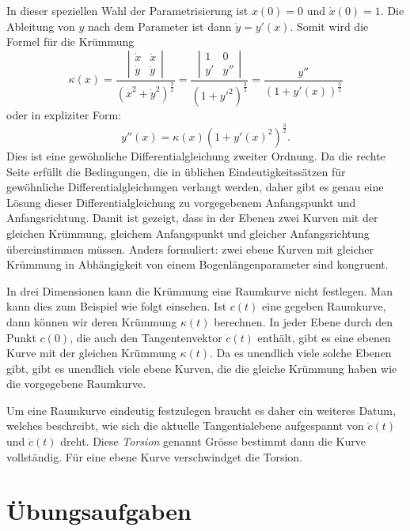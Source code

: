 
In dieser speziellen Wahl der Parametrisierung ist $x(0)=0$ und $\dot x(0)=1$.
Die Ableitung von $y$ nach dem Parameter ist dann $\dot y=y'(x)$.
Somit wird die Formel für die Krümmung
\[
\kappa(x)
=
\frac{\left|\begin{matrix}\dot x&\ddot x\\\dot y&\ddot y\end{matrix}\right|}{(\dot x^2+\dot y^2)^{\frac32}}
=
\frac{\left|\begin{matrix}1&0\\y'&y''\end{matrix}\right|}{(1+y'^2)^{\frac32}}
=
\frac{y''}{(1+y'(x))^{\frac32}}
\]
oder in expliziter Form:
\[
y''(x)=\kappa(x) (1+y'(x)^2)^{\frac32}.
\]
Dies ist eine gewöhnliche Differentialgleichung zweiter Ordnung.
Da die rechte Seite erfüllt die Bedingungen, die in üblichen
Eindeutigkeitssätzen für gewöhnliche Differentialgleichungen
verlangt werden, daher gibt es genau eine Lösung dieser
Differentialgleichung zu vorgegebenem Anfangspunkt und Anfangsrichtung.
Damit ist gezeigt, dass in der Ebenen zwei Kurven mit der gleichen
Krümmung, gleichem Anfangspunkt und gleicher Anfangsrichtung übereinstimmen
müssen.
Anders formuliert: zwei ebene Kurven mit gleicher Krümmung in Abhängigkeit
von einem Bogenlängenparameter sind kongruent.

In drei Dimensionen kann die Krümmung eine Raumkurve nicht festlegen.
Man kann dies zum Beispiel wie folgt einsehen.
Ist $c(t)$ eine gegeben Raumkurve, dann können wir deren Krümmung
$\kappa(t)$ berechnen.
In jeder Ebene durch den Punkt $c(0)$, die auch den Tangentenvektor
$\dot c(t)$ enthält, gibt es eine ebenen Kurve mit der gleichen
Krümmung $\kappa(t)$.
Da es unendlich viele solche Ebenen gibt, gibt es unendlich viele 
ebene Kurven, die die gleiche Krümmung haben wie die vorgegebene
Raumkurve.

Um eine Raumkurve eindeutig festzulegen braucht es daher ein weiteres
Datum, welches beschreibt, wie sich die aktuelle Tangentialebene
aufgespannt von $\dot c(t)$ und $\ddot c(t)$ dreht.
Diese {\em Torsion} genannt Grösse bestimmt dann die Kurve vollständig.
Für eine ebene Kurve verschwindget die Torsion.





\section*{Übungsaufgaben}

